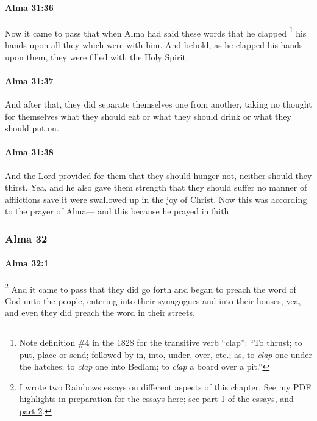 		\paragraph{Alma 31:36} %
			\label{ALMA-31-36}

			Now it came to pass that when Alma had said these words
			that he clapped%
				\footnote{%
					Note definition \#4 in the 1828 for the transitive verb ``clap'': ``To thrust; to put, place or send; followed by in, into, under, over, etc.; as, to \textit{clap} one under the hatches; to \textit{clap} one into Bedlam; to \textit{clap} a board over a pit.''
					}
			his hands upon all they which were with him.
			And behold, as he clapped his hands upon them,
			they were filled with the Holy Spirit.

		\paragraph{Alma 31:37} %
			\label{ALMA-31-37}

			And after that, they did separate themselves one from another,
			taking no thought for themselves what they should eat
			or what they should drink or what they should put on.

		\paragraph{Alma 31:38} %
			\label{ALMA-31-38}

			And the Lord provided for them
			that they should hunger not, neither should they thirst.
			Yea, and he also gave them strength that they should suffer no manner of afflictions
			save it were swallowed up in the joy of Christ.
			Now this was according to the prayer of Alma---
			and this because he prayed in faith.

	\subsubsection{Alma 32} %
		\label{ALMA-32}
		
		\paragraph{Alma 32:1} %
			\label{ALMA-32-1}

			\footnote{%
				I wrote two Rainbows essays on different aspects of this chapter. See my PDF highlights in preparation for the essays \href{https://drive.google.com/file/d/1LNlTYcxh5Q_PlKdVUidgKDDh7B2GLXJO/view?usp=drive_link}{here}; see \href{https://climbingtherainbows.substack.com/p/knowing-the-seed-truth-goodness-alma-32-p1}{part 1} of the essays, and \href{https://climbingtherainbows.substack.com/p/knowing-the-seed-truth-goodness-alma-32-p2}{part 2}.
				}%
			And it came to pass that they did go forth
			and began to preach the word of God unto the people,
			entering into their synagogues and into their houses;
			yea, and even they did preach the word in their streets.

